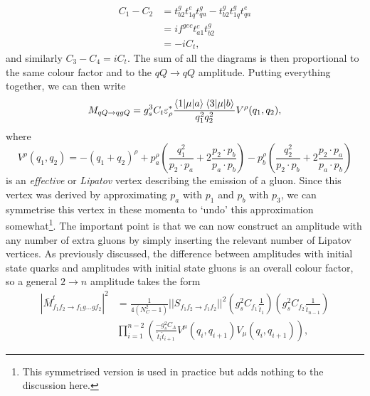 \begin{equation}
\begin{split}
C_1 - C_2 &= t^g_{b2} t^e_{1q} t^g_{qa} - t^g_{b2} t^g_{1q} t^e_{qa} \\
&=  if^{gec}t^c_{a1}t^g_{b2} \\
&= -i C_t,
\end{split}
\end{equation}
and similarly $C_3 - C_4 = iC_t$. The sum of all the diagrams is then proportional to the same colour factor and to the $qQ \to qQ$ amplitude. Putting everything together, we can then write
\begin{equation}
M_{qQ \to qgQ} = g_s^3 C_t \varepsilon^*_\rho \frac{\mathinner{\langle1\vert\mu\vert a\rangle}_{} \mathinner{\langle3\vert\mu\vert b\rangle}_{}}{q_1^2 q_2^2} V^\rho (q_1, q_2),
\end{equation}
where
\begin{equation}
V^\rho(q_1, q_2) = -(q_1 + q_2)^\rho + p_a^\rho \left( \frac{q_1^2}{p_2 \cdot p_a} + 2 \frac{p_2 \cdot p_b}{p_a \cdot p_b}\right) -  p_b^\rho \left( \frac{q_2^2}{p_2 \cdot p_b} + 2 \frac{p_2 \cdot p_a}{p_a \cdot p_b}\right)
\label{eqn:lipatov}
\end{equation}
is an \emph{effective} or \emph{Lipatov} vertex describing the emission of a gluon. Since this vertex was derived by approximating $p_a$ with $p_1$ and $p_b$ with $p_3$, we can symmetrise this vertex in these momenta to `undo' this approximation somewhat\footnote{This symmetrised version is used in practice but adds nothing to the discussion here.}. The important point is that we can now construct an amplitude with any number of extra gluons by simply inserting the relevant number of Lipatov vertices. As previously discussed, the difference between amplitudes with initial state quarks and amplitudes with initial state gluons is an overall colour factor, so a general $2 \to n$ amplitude takes the form
\begin{equation}
\begin{split}
|\bar{M}^t_{f_1 f_2 \to f_1 g ... g f_2}|^2 &= \frac{1}{4 (N_C^2 - 1)} ||S_{f_1 f_2 \to f_1 f_2} ||^2 \left(g_s^2 C_{f_1} \frac{1}{\hat{t}_1} \right) \left(g_s^2 C_{f_2} \frac{1}{\hat{t}_{n-1}} \right) \\
& \prod_{i=1}^{n-2} \left(\frac{-g_s^2 C_{A}}{\hat{t}_i \hat{t}_{i+1}} V^\mu (q_i, q_{i+1}) V_\mu (q_i, q_{i+1})  \right),
 \end{split}
\end{equation}
